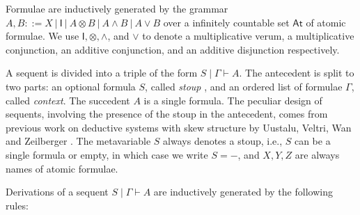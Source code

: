 \documentclass[submission,copyright,creativecommons]{eptcs}
\theoremstyle{definition}
\newcommand{\ot}{\otimes}
\newcommand{\I}{\mathsf{I}}
\begin{document}
Formulae are inductively generated by the grammar $A,B ::= X \ | \ \I \ | \ A \ot B \ | \ A \land B \ | \ A \lor B$ over a infinitely countable set $\mathsf{At}$ of atomic formulae. 
We use $\I , \ot , \land$, and $\lor$ to denote a multiplicative verum, a multiplicative conjunction, an additive conjunction, and an additive disjunction respectively.

A sequent is divided into a triple of the form $S \mid \Gamma \vdash A$.
The antecedent is split to two parts: an optional formula $S$, called \emph{stoup} \cite{girard:constructive:91}, and an ordered list of formulae $\Gamma$, called \emph{context}.
The succedent $A$ is a single formula.
The peculiar design of sequents, involving the presence of the stoup in the antecedent, comes from previous work on deductive systems with skew structure by Uustalu, Veltri, Wan and Zeilberger \cite{uustalu:sequent:2021,uustalu:proof:nodate,uustalu:deductive:nodate,veltri:coherence:2021,UVW:protsn}.
The metavariable $S$ always denotes a stoup, i.e., $S$ can be a single formula or empty, in which case we write $S = {-}$, and $X,Y,Z$ are always names of atomic formulae.

Derivations of a sequent $S \mid \Gamma \vdash A$ are inductively generated by the following rules:
\end{document}
